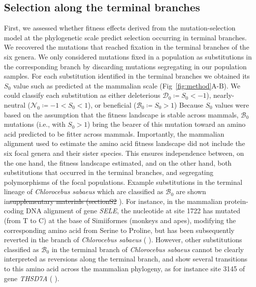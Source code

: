 \documentclass[10pt,letterpaper]{article}
\newcommand{\Sphy}{S_{0}}
\newcommand{\SphyDel}{\mathcal{D}_0}
\newcommand{\SphyNeu}{\mathcal{N}_0}
\newcommand{\SphyBen}{\mathcal{B}_0}
\providecommand{\DIFaddtex}[1]{{\protect\color{blue}\uwave{#1}}} %
\providecommand{\DIFdeltex}[1]{{\protect\color{red}\sout{#1}}}                      %
\providecommand{\DIFaddbegin}{} %
\providecommand{\DIFaddend}{} %
\providecommand{\DIFdelbegin}{} %
\providecommand{\DIFdelend}{} %
\providecommand{\DIFadd}[1]{\texorpdfstring{\DIFaddtex{#1}}{#1}} %
\providecommand{\DIFdel}[1]{\texorpdfstring{\DIFdeltex{#1}}{}} %
\newcommand{\DIFscaledelfig}{0.5}
\newlength{\DIFdelgraphicswidth} %
\newlength{\DIFdelgraphicsheight} %
\newcommand{\DIFaddincludegraphics}[2][]{{\color{blue}\fbox{\DIFOincludegraphics[#1]{#2}}}} %
\newcommand{\DIFdelincludegraphics}[2][]{%
\sbox{\DIFdelgraphicsbox}{\DIFOincludegraphics[#1]{#2}}%
\settoboxwidth{\DIFdelgraphicswidth}{\DIFdelgraphicsbox} %
\settoboxtotalheight{\DIFdelgraphicsheight}{\DIFdelgraphicsbox} %
\scalebox{\DIFscaledelfig}{%
\parbox[b]{\DIFdelgraphicswidth}{\usebox{\DIFdelgraphicsbox}\\[-\baselineskip] \rule{\DIFdelgraphicswidth}{0em}}\llap{\resizebox{\DIFdelgraphicswidth}{\DIFdelgraphicsheight}{%
\setlength{\unitlength}{\DIFdelgraphicswidth}%
\begin{picture}(1,1)%
\thicklines\linethickness{2pt} %
{\color[rgb]{1,0,0}\put(0,0){\framebox(1,1){}}}%
{\color[rgb]{1,0,0}\put(0,0){\line( 1,1){1}}}%
{\color[rgb]{1,0,0}\put(0,1){\line(1,-1){1}}}%
\end{picture}%
}\hspace*{3pt}}} %
} %
\DeclareRobustCommand{\DIFaddbegin}{\DIFOaddbegin \let\includegraphics\DIFaddincludegraphics} %
\DeclareRobustCommand{\DIFaddend}{\DIFOaddend \let\includegraphics\DIFOincludegraphics} %
\DeclareRobustCommand{\DIFdelbegin}{\DIFOdelbegin \let\includegraphics\DIFdelincludegraphics} %
\DeclareRobustCommand{\DIFdelend}{\DIFOaddend \let\includegraphics\DIFOincludegraphics} %
\begin{document}
\subsection*{Selection along the terminal branches}
First, we assessed whether fitness effects derived from the mutation-selection model at the phylogenetic scale predict selection occurring in terminal branches.
We recovered the mutations that reached fixation in the terminal branches of the six genera.
We only considered mutations fixed in a population as substitutions in the corresponding branch by discarding mutations segregating in our population samples.
For each substitution identified in the terminal branches we obtained its $\Sphy$ value such as predicted at the mammalian scale (Fig~\ref{fig:method}A-B).
We could classify each substitution as either deleterious $\SphyDel \coloneqq \Sphy < -1$), nearly-neutral ($\SphyNeu \coloneqq -1 < \Sphy <1$), or beneficial ($\SphyBen \coloneqq \Sphy > 1$)
Because $\Sphy$ values were based on the assumption that the fitness landscape is stable across mammals, $\SphyBen$ mutations (i.e., with $\Sphy>1$) bring the bearer of this mutation toward an amino acid predicted to be fitter across mammals.
Importantly, the mammalian alignment used to estimate the amino acid fitness landscape did not include the six focal genera and their sister species.
This ensures independence between, on the one hand, the fitness landscape estimated, and on the other hand, both substitutions that occurred in the terminal branches, and segregating polymorphisms of the focal populations.
Example substitutions in the terminal lineage of \textit{Chlorocebus sabaeus} which are classified as $\SphyBen$ are shown in\DIFdelbegin \DIFdel{supplementary materials (sectionS2}\DIFdelend \DIFaddbegin \DIFadd{~} \DIFadd{(section~1.1}\DIFaddend ).
For instance, in the mammalian protein-coding DNA alignment of gene \textit{SELE}, the nucleotide at site 1722 has mutated (from T to C) at the base of Simiiformes (monkeys and apes), modifying the corresponding amino acid from Serine to Proline, but has been subsequently reverted in the branch of \textit{Chlorocebus sabaeus} (\DIFdelbegin %
\DIFdelend \DIFaddbegin \DIFadd{Fig~A in~}\DIFaddend ).
However, other substitutions classified as $\SphyBen$ in the terminal branch of \textit{Chlorocebus sabaeus} cannot be clearly interpreted as reversions along the terminal branch, and show several transitions to this amino acid across the mammalian phylogeny, as for instance site 3145 of gene \textit{THSD7A} (\DIFdelbegin %
\DIFdelend \DIFaddbegin \DIFadd{Fig~B in~}\DIFaddend ).
\end{document}
